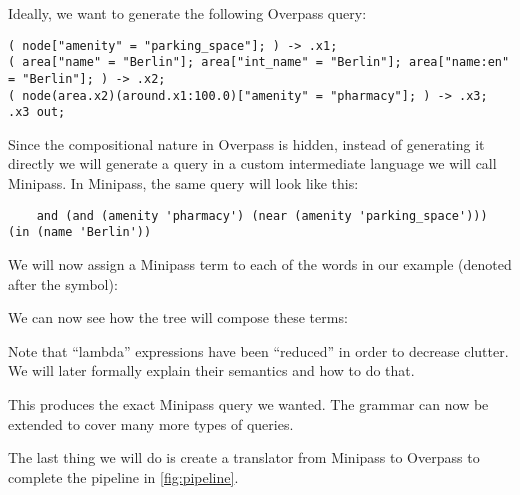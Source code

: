 \documentclass[main.tex]{subfiles}
\begin{document}
Ideally, we want to generate the following Overpass query:
\begin{lstlisting}
( node["amenity" = "parking_space"]; ) -> .x1;
( area["name" = "Berlin"]; area["int_name" = "Berlin"]; area["name:en" = "Berlin"]; ) -> .x2;
( node(area.x2)(around.x1:100.0)["amenity" = "pharmacy"]; ) -> .x3;
.x3 out;
\end{lstlisting}

Since the compositional nature in Overpass is hidden, instead of generating
it directly we will generate a query in a custom intermediate language we will
call Minipass. In Minipass, the same query will look like this:
\begin{lstlisting}
    and (and (amenity 'pharmacy') (near (amenity 'parking_space'))) (in (name 'Berlin'))
\end{lstlisting}

We will now assign a Minipass term to each of the words in our example (denoted
after the  symbol):

We can now see how the tree will compose these terms:

Note that ``lambda'' expressions have been ``reduced'' in order to decrease
clutter. We will later formally explain their semantics and how to do that.

This produces the exact Minipass query we wanted. The grammar can now be extended
to cover many more types of queries.

The last thing we will do is create a translator from Minipass to Overpass
to complete the pipeline in \cref{fig:pipeline}.

\end{document}
